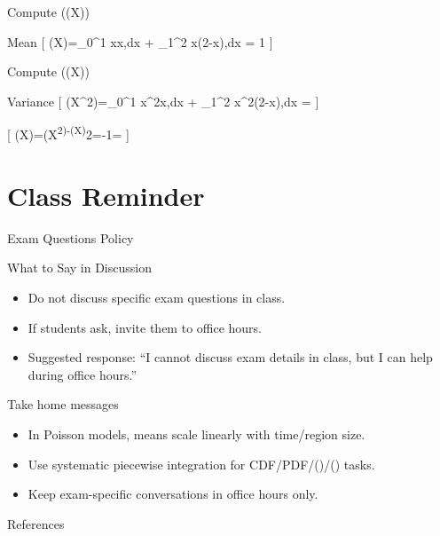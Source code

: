 \documentclass[
  ignorenonframetext,
]{beamer}
\providecommand{\tightlist}{%
  \setlength{\itemsep}{0pt}\setlength{\parskip}{0pt}}
\begin{document}
\begin{frame}{Compute (\Ex(X))}
\label{compute-x}
\begin{block}{Mean}
\label{mean}
{[} \Ex(X)=\int\_0\^{}1 x\cdot x,dx + \int\_1\^{}2 x(2-x),dx = 1 {]}
\end{block}
\end{frame}

\begin{frame}{Compute (\Var(X))}
\label{compute-x-1}
\begin{block}{Variance}
\label{variance}
{[} \Ex(X\^{}2)=\int\_0\^{}1 x\^{}2\cdot x,dx + \int\_1\^{}2
x\^{}2(2-x),dx =  {]}

{[} \Var(X)=\Ex(X\textsuperscript{2)-\Ex(X)}2=-1=
{]}
\end{block}
\end{frame}

\section{Class Reminder}\label{class-reminder}

\begin{frame}{Exam Questions Policy}
\label{exam-questions-policy}
\begin{block}{What to Say in Discussion}
\label{what-to-say-in-discussion}
\begin{itemize}
\tightlist
\item
  Do not discuss specific exam questions in class.
\item
  If students ask, invite them to office hours.
\item
  Suggested response: ``I cannot discuss exam details in class, but I
  can help during office hours.''
\end{itemize}
\end{block}
\end{frame}

\begin{frame}{Take home messages}
\label{take-home-messages}
\begin{itemize}
\tightlist
\item
  In Poisson models, means scale linearly with time/region size.
\item
  Use systematic piecewise integration for CDF/PDF/(\Ex)/(\Var) tasks.
\item
  Keep exam-specific conversations in office hours only.
\end{itemize}
\end{frame}

\begin{frame}[allowframebreaks]{References}
\label{references}
\end{frame}
\end{document}

